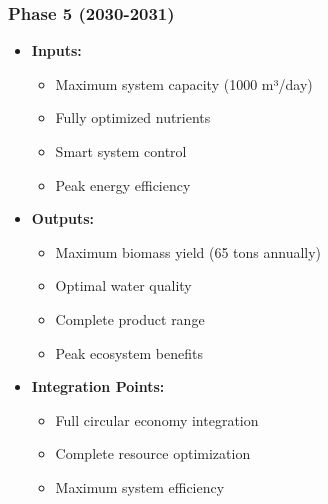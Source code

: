 \subsubsection{Phase 5 (2030-2031)}
\begin{itemize}
    \item \textbf{Inputs:}
    \begin{itemize}
        \item Maximum system capacity (1000 m³/day)
        \item Fully optimized nutrients
        \item Smart system control
        \item Peak energy efficiency
    \end{itemize}
    \item \textbf{Outputs:}
    \begin{itemize}
        \item Maximum biomass yield (65 tons annually)
        \item Optimal water quality
        \item Complete product range
        \item Peak ecosystem benefits
    \end{itemize}
    \item \textbf{Integration Points:}
    \begin{itemize}
        \item Full circular economy integration
        \item Complete resource optimization
        \item Maximum system efficiency
    \end{itemize}
\end{itemize}
